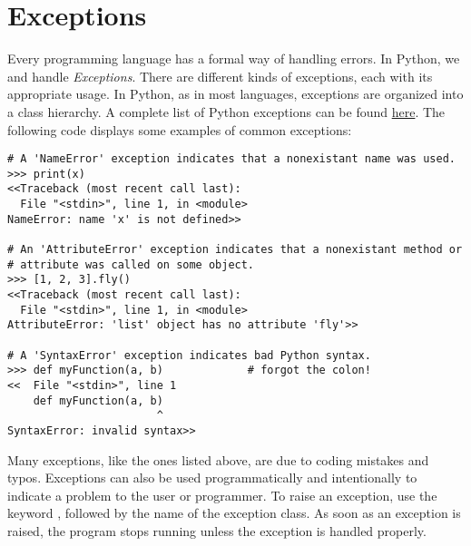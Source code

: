 \label{lab:Exceptions and File I/O}


\section*{Exceptions}

Every programming language has a formal way of handling errors.
In Python, we  and handle \emph{Exceptions}.
There are different kinds of exceptions, each with its appropriate usage.
In Python, as in most languages, exceptions are organized into a class hierarchy.
A complete list of Python exceptions can be found \href{https://docs.python.org/2/library/exceptions.html}{here}.
The following code displays some examples of common exceptions:

\begin{lstlisting}
# A 'NameError' exception indicates that a nonexistant name was used.
>>> print(x)
<<Traceback (most recent call last):
  File "<stdin>", line 1, in <module>
NameError: name 'x' is not defined>>

# An 'AttributeError' exception indicates that a nonexistant method or
# attribute was called on some object.
>>> [1, 2, 3].fly()
<<Traceback (most recent call last):
  File "<stdin>", line 1, in <module>
AttributeError: 'list' object has no attribute 'fly'>>

# A 'SyntaxError' exception indicates bad Python syntax.
>>> def myFunction(a, b)             # forgot the colon!
<<  File "<stdin>", line 1
    def myFunction(a, b)
                       ^
SyntaxError: invalid syntax>>
\end{lstlisting}

Many exceptions, like the ones listed above, are due to coding mistakes and typos.
Exceptions can also be used programmatically and intentionally to indicate a problem to the user or programmer.
To raise an exception, use the keyword , followed by the name of the exception class.
As soon as an exception is raised, the program stops running unless the exception is handled properly.

